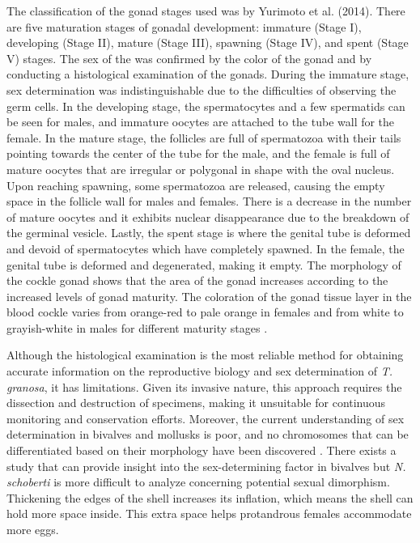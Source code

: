 {The classification of the gonad stages used was by Yurimoto et al. (2014). There are five maturation stages of gonadal development: immature (Stage I), developing (Stage II), mature (Stage III), spawning (Stage IV), and spent (Stage V) stages. The sex of the \Tgranosa was confirmed by the color of the gonad and by conducting a histological examination of the gonads. During the immature stage, sex determination was indistinguishable due to the difficulties of observing the germ cells. In the developing stage, the spermatocytes and a few spermatids can be seen for males, and immature oocytes are attached to the tube wall for the female. In the mature stage, the follicles are full of spermatozoa with their tails pointing towards the center of the tube for the male, and the female is full of mature oocytes that are irregular or polygonal in shape with the oval nucleus. Upon reaching spawning, some spermatozoa are released, causing the empty space in the follicle wall for males and females. There is a decrease in the number of mature oocytes and it exhibits nuclear disappearance due to the breakdown of the germinal vesicle. Lastly, the spent stage is where the genital tube is deformed and devoid of spermatocytes which have completely spawned. In the female, the genital tube is deformed and degenerated, making it empty. The morphology of the cockle gonad shows that the area of the gonad increases according to the increased levels of gonad maturity. The coloration of the gonad tissue layer in the blood cockle varies from orange-red to pale orange in females and from white to grayish-white in males for different maturity stages \cite{may2021}. 

Although the histological examination is the most reliable method for obtaining accurate information on the reproductive biology and sex determination of \textit{T. granosa}, it has limitations. Given its invasive nature, this approach requires the dissection and destruction of specimens, making it unsuitable for continuous monitoring and conservation efforts. Moreover, the current understanding of sex determination in bivalves and mollusks is poor, and no chromosomes that can be differentiated based on their morphology have been discovered \cite{afiati2007}. There exists a study that can provide insight into the sex-determining factor in bivalves but  \textit{N. schoberti} is more difficult to analyze concerning potential sexual dimorphism. Thickening the edges of the shell increases its inflation, which means the shell can hold more space inside. This extra space helps protandrous females accommodate more eggs.

}

